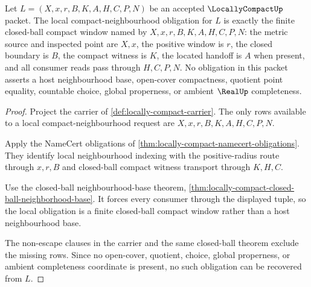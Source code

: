 \begin{theorem}
\label{thm:locallycompact-local-compact-neighborhood-obligations}
Let $L=(X,x,r,B,K,A,H,C,P,N)$ be an accepted $\LocallyCompactUp$ packet. The local compact-neighbourhood obligation for $L$ is exactly the finite closed-ball compact window named by $X,x,r,B,K,A,H,C,P,N$: the metric source and inspected point are $X,x$, the positive window is $r$, the closed boundary is $B$, the compact witness is $K$, the located handoff is $A$ when present, and all consumer reads pass through $H,C,P,N$. No obligation in this packet asserts a host neighbourhood base, open-cover compactness, quotient point equality, countable choice, global properness, or ambient $\RealUp$ completeness.
\end{theorem}
\begin{proof}
Project the carrier of \autoref{def:locally-compact-carrier}. The only rows available to a local compact-neighbourhood request are $X,x,r,B,K,A,H,C,P,N$.

Apply the NameCert obligations of \autoref{thm:locally-compact-namecert-obligations}. They identify local neighbourhood indexing with the positive-radius route through $x,r,B$ and closed-ball compact witness transport through $K,H,C$.

Use the closed-ball neighbourhood-base theorem, \autoref{thm:locally-compact-closed-ball-neighborhood-base}. It forces every consumer through the displayed tuple, so the local obligation is a finite closed-ball compact window rather than a host neighbourhood base.

The non-escape clauses in the carrier and the same closed-ball theorem exclude the missing rows. Since no open-cover, quotient, choice, global properness, or ambient completeness coordinate is present, no such obligation can be recovered from $L$.
\end{proof}

